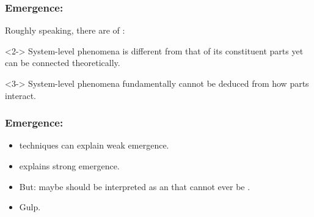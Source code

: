 \begin{frame}
  \frametitle{Emergence:}

  \begin{block}{}
    Roughly speaking, there are  of :  
  \end{block}

  \begin{block}<2->{}
    System-level phenomena is
    different from that of its constituent parts
    yet can be connected theoretically.
  \end{block}

  \begin{block}<3->{}
    System-level 
    phenomena fundamentally cannot
    be deduced from how parts interact.
  \end{block}


\end{frame}

\begin{frame}
  \frametitle{Emergence:}

  \begin{block}{}
    \begin{itemize}
    \item<+->
       techniques can explain weak emergence.
    \item<+->
       explains strong emergence.\cite{bedau1997a}
    \item<+->
      But: maybe  should be interpreted
      as an  that cannot
      ever be .    
    \item<+->
      Gulp.
    \end{itemize}
  \end{block}

\end{frame}

